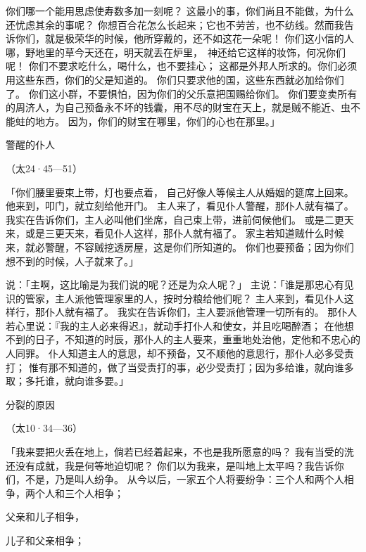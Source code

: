 {你们哪一个能用思虑使寿数多加一刻呢？
这最小的事，你们尚且不能做，为什么还忧虑其余的事呢？
你想百合花怎么长起来；它也不劳苦，也不纺线。然而我告诉你们，就是{}极荣华的时候，他所穿戴的，还不如这花一朵呢！
你们这小信的人哪，野地里的草今天还在，明天就丢在炉里，　神还给它这样的妆饰，何况你们呢！
你们不要求吃什么，喝什么，也不要挂心；
这都是外邦人所求的。你们必须用这些东西，你们的父是知道的。
你们只要求他的国，这些东西就必加给你们了。
你们这小群，不要惧怕，因为你们的父乐意把国赐给你们。
你们要变卖所有的周济人，为自己预备永不坏的钱囊，用不尽的财宝在天上，就是贼不能近、虫不能蛀的地方。
因为，你们的财宝在哪里，你们的心也在那里。」
\par }{\SH 警醒的仆人
\par }{\R （太24·45—51）
\par }{\PP {}「你们腰里要束上带，灯也要点着，
自己好像{}人等候主人从婚姻的筵席上回来。他来到，叩门，就立刻给他开门。
主人来了，看见仆人警醒，那仆人就有福了。我实在告诉你们，主人必叫他们坐席，自己束上带，进前伺候他们。
或是二更天来，或是三更天来，看见仆人这样，那仆人就有福了。
家主若知道贼什么时候来，就必警醒，不容贼挖透房屋，这是你们所知道的。
你们也要预备；因为你们想不到的时候，人子就来了。」
\par }{\PP {}说：「主啊，这比喻是为我们说的呢？还是为众人呢？」
主说：「谁是那忠心有见识的管家，主人派他管理家里的人，按时分粮给他们呢？
主人来到，看见仆人这样行，那仆人就有福了。
我实在告诉你们，主人要派他管理一切所有的。
那仆人若心里说：『我的主人必来得迟』，就动手打仆人和使女，并且吃喝醉酒；
在他想不到的日子，不知道的时辰，那仆人的主人要来，重重地处治他，定他和不忠心的人同罪。
仆人知道主人的意思，却不预备，又不顺他的意思行，那仆人必多受责打；
惟有那不知道的，做了当受责打的事，必少受责打；因为多给谁，就向谁多取；多托谁，就向谁多要。」
\par }{\SH 分裂的原因
\par }{\R （太10·34—36）
\par }{\PP {}「我来要把火丢在地上，倘若已经着起来，不也是我所愿意的吗？
我有当受的洗还没有成就，我是何等地迫切呢？
你们以为我来，是叫地上太平吗？我告诉你们，不是，乃是叫人纷争。
从今以后，一家五个人将要纷争：三个人和两个人相争，两个人和三个人相争；
\par }{\Q {}父亲和儿子相争，
\par }{\Q 儿子和父亲相争；
}

